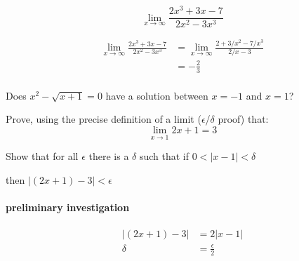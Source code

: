 \documentclass[letterpaper]{exam}
\begin{document}
\begin{questions}


    \question[7] 
    \label{q:last_limit}
      \[
        \lim_{x \to \infty} \frac{2x^3 + 3x - 7}{2x^2 - 3x^3}
      \]

      \begin{solution}
        \begin{align*}
          \lim_{x \to \infty} \frac{2x^3 + 3x - 7}{2x^2 - 3x^3} & = \lim_{x \to \infty} \frac{2 + 3/x^2 - 7/x^3}{2/x - 3} \\
                                                                & = \boxed{ - \frac{2}{3} } \\
        \end{align*}
      \end{solution}

    \question[5] Does $x^2 - \sqrt{x + 1} = 0$ have a solution between $x = -1$ and $x = 1$?

    \question[10]
      Prove, using the precise definition of a limit ($\epsilon$/$\delta$ proof) that:
      \[
        \lim_{x \to 1} 2x + 1 = 3
      \]

      \begin{solution}
        Show that for all $\epsilon$ there is a $\delta$ such that if 
        $0 < |x - 1| < \delta$ 
        
        then $|(2x + 1) - 3| < \epsilon$

        \paragraph{preliminary investigation}
        \begin{align*}
          |(2x + 1) - 3| & = 2|x - 1| \\
          \delta         & = \frac{\epsilon}{2} \\
        \end{align*}


\end{solution}
\end{questions}
\end{document}
